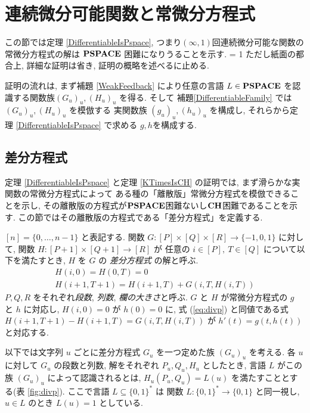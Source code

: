 \section{連続微分可能関数と常微分方程式}
\label{section:differentiable}

この節では定理 \ref{DifferentiableIsPspace},
つまり$(\infty, 1)$回連続微分可能な関数の常微分方程式の解は
$\mathbf{PSPACE}$ 困難になりうることを示す.
\ifnum \proc = 1
ただし紙面の都合上, 詳細な証明は省き, 証明の概略を述べるに止める.
\fi

証明の流れは, まず補題 \ref{WeakFeedback} により任意の言語
$L \in \mathbf{PSPACE}$ を認識する関数族$(G_u)_u, (H_u)_u$ を得る.
そして 補題\ref{DifferentiableFamily} では $(G_u)_u, (H_u)_u$ を模倣する
実関数族 $(g_u)_u, (h_u)_u$ を構成し,
それらから定理 \ref{DifferentiableIsPspace} で求める $g, h$を構成する.


\subsection{差分方程式}
\label{section:divp}

定理 \ref{DifferentiableIsPspace} と定理 \ref{KTimesIsCH} の証明では,
まず滑らかな実関数の常微分方程式によって
ある種の「離散版」常微分方程式を模倣できることを示し, 
その離散版の方程式が$\mathbf{PSPACE}$困難ないし$\mathbf{CH}$困難であることを示す.
この節ではその離散版の方程式である「差分方程式」を定義する.

$[n] = \{0, \dots , n-1\}$ と表記する.
関数 $G \colon [P] \times [Q] \times [R] \to \{-1, 0, 1\}$ に対して,
関数 $H \colon [P + 1] \times [Q+1] \to [R]$ が
任意の $i \in [P],\ T \in [Q]$ について以下を満たすとき,
$H$ を $G$ の \emph{差分方程式} の解と呼ぶ.
\begin{gather}
   H(i, 0) = H(0, T) = 0 
\\
   H(i + 1, T + 1) = H(i+1, T) + G(i, T, H(i, T))  \label{eq:divp}
\end{gather}
$P, Q, R$ をそれぞれ\emph{段数}, \emph{列数}, \emph{欄の大きさ}と呼ぶ.
$G$ と $H$ が常微分方程式の $g$ と $h$ に対応し,
$H(i, 0) = 0$ が $h(0) = 0$ に,
式 (\ref{eq:divp}) と同値である式 $H(i + 1, T + 1) - H(i+1, T) = G(i, T, H(i, T))$
が $h'(t) = g(t, h(t))$ と対応する.

以下では文字列 $u$ ごとに差分方程式 $G _u$ を一つ定めた族 $(G _u) _u$ を考える. 
各 $u$ に対して $G_u$ の段数と列数, 解をそれぞれ $P_u, Q_u, H_u$ としたとき,
言語 $L$ がこの族 $(G_u)_u$ によって認識されるとは,
$H_u(P_u, Q_u) = L(u)$ を満たすこととする(表 \ref{fig:divp}).
ここで言語 $L \subseteq \{0, 1\} ^*$ は
関数 $L \colon \{0, 1\} ^* \to \{0, 1\}$ と同一視し, 
$u \in L$ のとき $L (u) = 1$ としている. 

